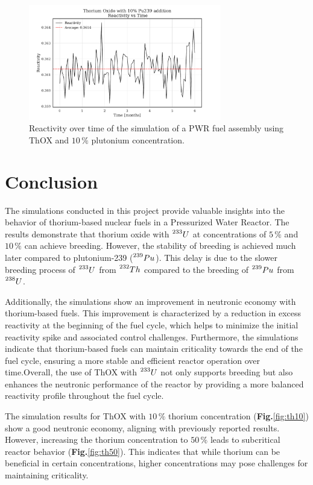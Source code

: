 \begin{figure}[h]
    \centering
    \includegraphics[width=0.75\textwidth, scale = 0.5]{Kap7/Figures_Kap7/Reactivity_vs_Time_ThOX_Pu10.pdf}
    \caption{Reactivity over time of the simulation of a PWR fuel assembly using ThOX and \(10 \, \%\) plutonium concentration.}
    \label{fig:p_th_pu}
\end{figure}

\section{Conclusion}
The simulations conducted in this project provide valuable insights into the behavior of thorium-based nuclear fuels in a Pressurized Water Reactor. The results demonstrate that thorium oxide with \(\prescript{233}{}{U}\) at concentrations of \(5 \, \%\) and \(10 \, \%\) can achieve breeding. However, the stability of breeding is achieved much later compared to plutonium-239 (\(\prescript{239}{}{Pu}\)). This delay is due to the slower breeding process of \(\prescript{233}{}{U}\) from \(\prescript{232}{}{Th}\) compared to the breeding of \(\prescript{239}{}{Pu}\) from \(\prescript{238}{}{U}\).

Additionally, the simulations show an improvement in neutronic economy with thorium-based fuels. This improvement is characterized by a reduction in excess reactivity at the beginning of the fuel cycle, which helps to minimize the initial reactivity spike and associated control challenges. Furthermore, the simulations indicate that thorium-based fuels can maintain criticality towards the end of the fuel cycle, ensuring a more stable and efficient reactor operation over time.Overall, the use of ThOX with \(\prescript{233}{}{U}\) not only supports breeding but also enhances the neutronic performance of the reactor by providing a more balanced reactivity profile throughout the fuel cycle.

The simulation results for ThOX with \(10 \, \%\) thorium concentration (\textbf{Fig.}\ref{fig:th10}) show a good neutronic economy, aligning with previously reported results. However, increasing the thorium concentration to \(50 \, \%\) leads to subcritical reactor behavior (\textbf{Fig.}\ref{fig:th50}). This indicates that while thorium can be beneficial in certain concentrations, higher concentrations may pose challenges for maintaining criticality.


